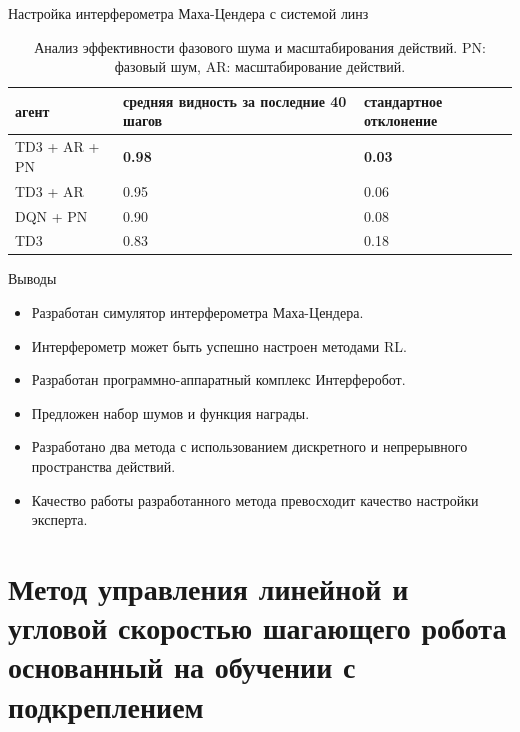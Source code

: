 \begin{frame}[allowframebreaks]{Настройка интерферометра Маха-Цендера с системой линз}
\begin{table} [htbp]
    \centering
    \begin{threeparttable}
        \caption*{Анализ эффективности фазового шума и масштабирования действий. PN: фазовый шум, AR: масштабирование действий.}
        \begin{tabular}{| p{3cm} || p{3cm} || p{3cm} |}
            \hline
            \hline
            агент & средняя видность за последние 40 шагов & стандартное отклонение \\
            \hline
            TD3 + AR + PN & \textbf{0.98} & \textbf{0.03} \\
            TD3 + AR & 0.95 & 0.06\\
            DQN + PN & 0.90 & 0.08\\
            TD3& 0.83 & 0.18\\
            \hline
            \hline
        \end{tabular}
    \end{threeparttable}
\end{table}

\end{frame}


\begin{frame}{Выводы}
\begin{itemize}
    \item Разработан симулятор интерферометра Маха-Цендера.
    \item Интерферометр может быть успешно настроен методами RL.
    \item Разработан программно-аппаратный комплекс Интерферобот.
    \item Предложен набор шумов и функция награды.
    \item Разработано два метода с использованием  дискретного и непрерывного пространства действий.
    \item  Качество работы разработанного метода превосходит качество настройки эксперта.

\end{itemize}
    



\end{frame}



\section{Метод управления линейной и угловой скоростью шагающего робота основанный на обучении с подкреплением}

